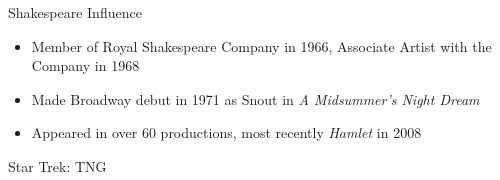 \documentclass[xcolor=dvipsnames]{beamer}
\begin{document}
\begin{frame}{Shakespeare Influence}
  \begin{itemize}
    \item Member of Royal Shakespeare Company in 1966, Associate Artist with the Company in 1968
    \item Made Broadway debut in 1971 as Snout in \emph{A Midsummer's Night Dream}
    \begin{qct}
    \end{qct}
    \item Appeared in over 60 productions, most recently \emph{Hamlet} in 2008
  \end{itemize}
\end{frame}

\begin{frame}{Star Trek: TNG}

\end{frame}
\end{document}
